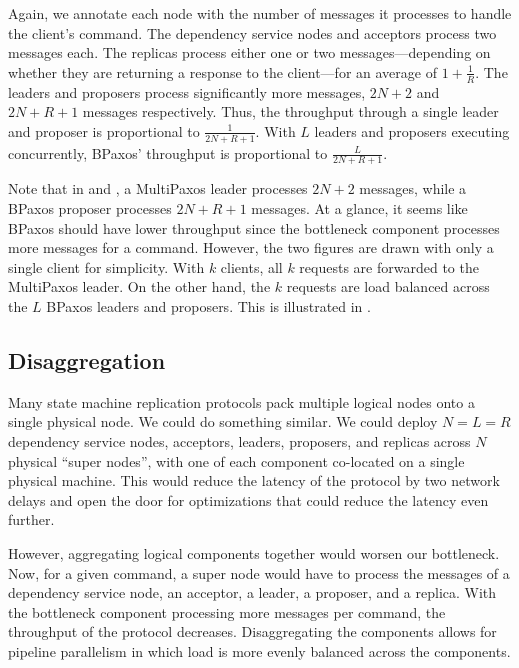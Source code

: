 Again, we annotate each node with the number of messages it processes to handle
the client's command. The dependency service nodes and acceptors process two
messages each. The replicas process either one or two messages---depending on
whether they are returning a response to the client---for an average of
$1+\frac{1}{R}$. The leaders and proposers process significantly more messages,
$2N+2$ and $2N+R+1$ messages respectively. Thus, the throughput through a
single leader and proposer is proportional to $\frac{1}{2N+R+1}$. With $L$
leaders and proposers executing concurrently, BPaxos' throughput is
proportional to $\frac{L}{2N+R+1}$.

Note that in  and , a
MultiPaxos leader processes $2N + 2$ messages, while a BPaxos proposer
processes $2N + R + 1$ messages. At a glance, it seems like BPaxos should have
lower throughput since the bottleneck component processes more messages for a
command. However, the two figures are drawn with only a single client for
simplicity. With $k$ clients, all $k$ requests are forwarded to the MultiPaxos
leader. On the other hand, the $k$ requests are load balanced across the $L$
BPaxos leaders and proposers. This is illustrated in .

{}

\subsection{Disaggregation}
Many state machine replication protocols pack multiple logical nodes onto a
single physical node. We could do something similar. We could deploy $N=L=R$
dependency service nodes, acceptors, leaders, proposers, and replicas across
$N$ physical ``super nodes'', with one of each component co-located on a single
physical machine. This would reduce the latency of the protocol by two network
delays and open the door for optimizations that could reduce the latency even
further.

However, aggregating logical components together would worsen our bottleneck.
Now, for a given command, a super node would have to process the messages of a
dependency service node, an acceptor, a leader, a proposer, and a replica. With
the bottleneck component processing more messages per command, the throughput
of the protocol decreases. Disaggregating the components allows for pipeline
parallelism in which load is more evenly balanced across the components.

